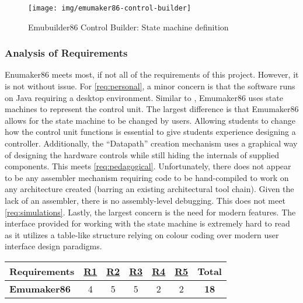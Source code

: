 \begin{figure}[bp!]
    \centering
    \texttt{[image: img/emumaker86-control-builder]}
    \caption{Emubuilder86 Control Builder: State machine definition\cite[p.~325]{Black2013}}
    \label{fig:emumaker86-control-builder}
\end{figure}

\subsubsection*{Analysis of Requirements}

Enumaker86 meets most, if not all of the requirements of this project. However, it is not without issue. For \cref{req:personal}, a minor concern is that the software runs on Java requiring a desktop environment. Similar to \cite{McLoughlin2010,Nakamura2013}, Emumaker86 uses state machines to represent the control unit. The largest difference is that Emumaker86 allows for the state machine to be changed by users. Allowing students to change how the control unit functions is essential to give students experience designing a controller. Additionally, the ``Datapath'' creation mechanism uses a graphical way of designing the hardware controls while still hiding the internals of supplied components. This meets \cref{req:pedagogical}. Unfortunately, there does not appear to be any assembler mechanism requiring code to be hand-compiled to work on any architecture created (barring an existing architectural tool chain). Given the lack of an assembler, there is no assembly-level debugging. This does not meet \cref{req:simulations}. Lastly, the largest concern is the need for modern features. The interface provided for working with the state machine is extremely hard to read as it utilizes a table-like structure relying on colour coding over modern user interface design paradigms.

\begin{table}[h!]
    \centering
    \begin{tabular}{lcccccc}
        \textbf{Requirements} & \textbf{\hyperref[req:personal]{R1}} & \textbf{\hyperref[req:configuration]{R2}} & \textbf{\hyperref[req:pedagogical]{R3}} & \textbf{\hyperref[req:simulations]{R4}} & \textbf{\hyperref[req:modern]{R5}} & \textbf{Total} \\ \hline
        \textbf{Emumaker86}      & 4                                  & 5                                    & 5                            & 2                                  & 2                             & \textbf{18}   
    \end{tabular}
\end{table}

